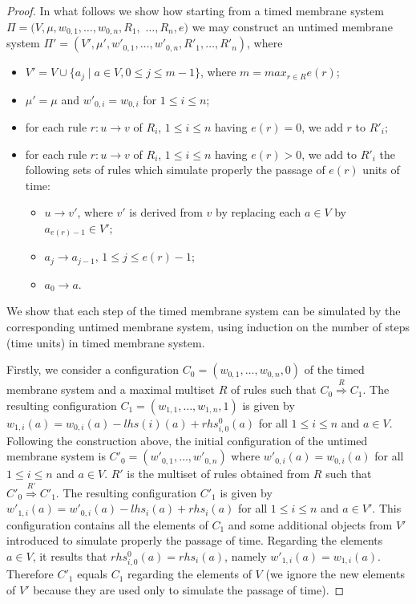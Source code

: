 \documentclass{eptcs}
\begin{document}
\begin{proof} In what follows we show how starting from
a timed membrane system $\Pi=(V,\mu,w_{0,1},\ldots,w_{0,n},R_1,$
$\ldots,R_n,e)$ we may construct an untimed membrane system
$\Pi'=(V',\mu',w'_{0,1},\ldots,w'_{0,n},R'_1,\ldots,R'_n)$, where
\begin{itemize}
\item $V'=V \cup \{a_j\mid a\in V, 0 \leq j \leq m-1\}$, where $m=max_{r\in
R}e(r)$;
\item $\mu'=\mu$ and $w'_{0,i}=w_{0,i}$ for $1 \leq i \leq n$;
\item for each rule $r:u \rightarrow v$ of $R_i$, $1 \leq i \leq
n$ having $e(r)= 0$, we add $r$ to $R'_i$;
\item for each rule $r:u \rightarrow v$ of $R_i$, $1 \leq i \leq
n$ having $e(r)> 0$, we add to $R'_i$ the following sets of rules
which simulate properly the passage of $e(r)$ units of time:
\begin{itemize}
\item $u \rightarrow v'$, where $v'$ is derived from $v$ by
replacing each $a\in V$ by $a_{e(r)-1}\in V'$;
\item $a_j \rightarrow a_{j-1}$, $1 \leq j \leq e(r)-1$;
\item $a_0 \rightarrow a$.
\end{itemize}
\end{itemize}
We show that each step of the timed membrane system can be simulated
by the corresponding untimed membrane system, using induction
on the number of steps (time units) in timed membrane system.

Firstly, we consider a configuration
$C_0=(w_{0,1},\ldots,w_{0,n},0)$ of the timed membrane system and a
maximal multiset $R$ of rules such that
$C_0\stackrel{R}{\Longrightarrow}C_{1}$. The resulting configuration
$C_{1}=(w_{1,1},\ldots,w_{1,n},1)$ is given by
$w_{1,i}(a)=w_{0,i}(a)-lhs(i)(a)+rhs^0_{i,0}(a)$ for all $1\leq
i\leq n$ and $a \in V$. Following the construction above, the
initial configuration of the untimed membrane system is
$C'_0=(w'_{0,1},\ldots,w'_{0,n})$ where $w'_{0,i}(a)=w_{0,i}(a)$ for
all $1\leq i\leq n$ and $a \in V$. $R'$ is the multiset of rules
obtained from $R$ such that
$C'_0\stackrel{R'}{\Longrightarrow}C'_{1}$. The resulting
configuration $C'_1$ is given by
$w'_{1,i}(a)=w'_{0,i}(a)-lhs_{i}(a)+rhs_i(a)$ for all $1\leq i\leq
n$ and $a \in V'$. This configuration contains all the elements of
$C_1$ and some additional objects from $V'$ introduced to simulate
properly the passage of time. Regarding the elements $a\in V$, it
results that $rhs^0_{i,0}(a)=rhs_i(a)$, namely
$w'_{1,i}(a)=w_{1,i}(a)$. Therefore $C'_1$ equals $C_1$ regarding
the elements of $V$ (we ignore the new elements of $V'$
because they are used only to simulate the passage of time).


\end{proof}
\end{document}
